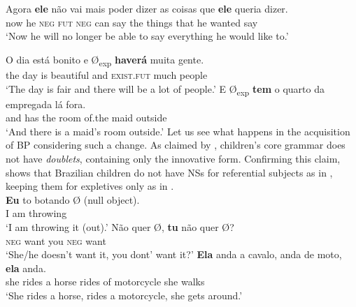 \documentclass[output=paper,colorlinks,citecolor=brown]{langscibook}
\begin{document}
   \ex\label{ex:03:kato:13c}
 \gll Agora \textbf{ele} não vai mais poder dizer as coisas que \textbf{ele} queria dizer.\\
            now    he  \textsc{neg}  \textsc{fut}  \textsc{neg} can    say    the things that he wanted say \\ 
          \glt ‘Now he will no longer be able to say everything he would like to.’ 
   \z
\z

\ea\label{ex:03:kato:14} %
   \ea\label{ex:03:kato:14a}
 \gll O   dia está bonito     e     Ø\textsubscript{exp} \textbf{haverá}          muita gente. \\
           the day is   beautiful and     {}     \textsc{exist}.\textsc{fut} much people \\ 
           \glt ‘The day is fair and there will be a lot of people.’ 
   \ex\label{ex:03:kato:14b}
 \gll E Ø\textsubscript{exp} \textbf{tem} o quarto da empregada {lá fora}.\footnotemark{} \\
            and   {}   has  the room of.the maid    outside \\ 
            \glt ‘And there is a maid’s room outside.’ 
   \z
{}
\z
\clearpage
Let us see what happens in the acquisition of BP considering such a change. As claimed by \citet{lightfoot_development_1999}, children’s core grammar does not have \emph{doublets}, containing only the innovative form. Confirming this claim, \citet{simoes_null_2000} shows that Brazilian children do not have NSs for referential subjects as in , keeping them for expletives only as in .\\

\ea\label{ex:03:kato:15} %
   \ea\label{ex:03:kato:15a}
 \gll \textbf{Eu} to botando Ø (null object).\\
            I   am throwing\\
            \glt ‘I am throwing it (out).’
   \ex\label{ex:03:kato:15b}
 \gll Não   quer Ø, \textbf{tu}  não    quer Ø?\\
            \textsc{neg} want {}   you \textsc{neg} want \\
            \glt ‘She/he doesn't want it, you dont' want it?’
   \ex\label{ex:03:kato:15c}
 \gll \textbf{Ela} anda a cavalo, anda de moto, \textbf{ela} anda. \\
            she rides a horse rides of motorcycle she walks  \\ 
            \glt ‘She rides a horse, rides a motorcycle, she gets around.’ 
   \z
\z
\end{document}
